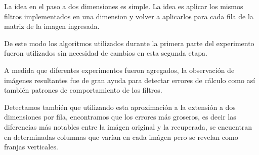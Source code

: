 La idea en el paso a dos dimensiones es simple. La idea es aplicar los mismos
filtros implementados en una dimension y volver a aplicarlos para cada fila de
la matriz de la imagen ingresada.

De este modo los algoritmos utilizados durante la primera parte del experimento
fueron utilizados sin necesidad de cambios en esta segunda etapa.

A medida que diferentes experimentos fueron agregados, la observaci\'on de
im\'agenes resultantes fue de gran ayuda para detectar errores de c\'alculo como
as\'i tambi\'en patrones de comportamiento de los filtros.

Detectamos tambi\'en que utilizando esta aproximaci\'on a la extensi\'on a dos
dimensiones por fila, encontramos que los errores m\'as groseros, es decir las
diferencias m\'as notables entre la im\'agen original y la recuperada, se
encuentran en determinadas columnas que var\'ian en cada im\'agen pero se
revelan como franjas verticales.
